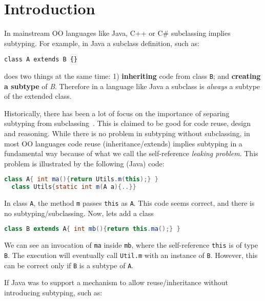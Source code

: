 \section{Introduction}

In mainstream OO languages like Java, C++ or C\# subclassing 
implies subtyping. For example, in Java a subclass definition, such as:

\begin{lstlisting}
class A extends B {}
\end{lstlisting}

\noindent does two things at the same time:
1) {\bf inheriting} code from class \lstinline{B}; and {\bf creating 
a subtype} of \emph{B}. Therefore in a language like Java 
a subclass is \emph{always} a subtype of the extended class.

Historically, there has been a lot of focus on the importance of
separing subtyping from subclassing~\cite{cook}.  This is claimed to be
good for code reuse, design and reasoning. 
While there is no problem
in subtyping without subclassing, in most OO languages code reuse
(inheritance/extends) implies subtyping in a fundamental way because 
of what we call the self-reference \emph{leaking problem}. This 
problem is illustrated by the following (Java) code:

\begin{lstlisting}[language=Java]
  class A{ int ma(){return Utils.m(this);} }
  class Utils{static int m(A a){..}}
\end{lstlisting}

In class \lstinline{A}, the method \lstinline{m} passes \lstinline{this} as \lstinline{A}.
This code seems correct, and there is no subtyping/subclassing.
Now, lets add a class \Q@B@

\begin{lstlisting}[language=Java]
  class B extends A{ int mb(){return this.ma();} }  
\end{lstlisting}

We can see an invocation of \lstinline{ma} inside
\lstinline{mb}, where the self-reference \lstinline{this} is of type \lstinline{B}. 
The execution will eventually call \lstinline{Util.m} with an
instance of \lstinline{B}. However, this can be correct only if \lstinline{B} is a subtype of
\lstinline{A}. 

If Java was to support a mechanism to allow reuse/inheritance 
without introducing subtyping, such as:


